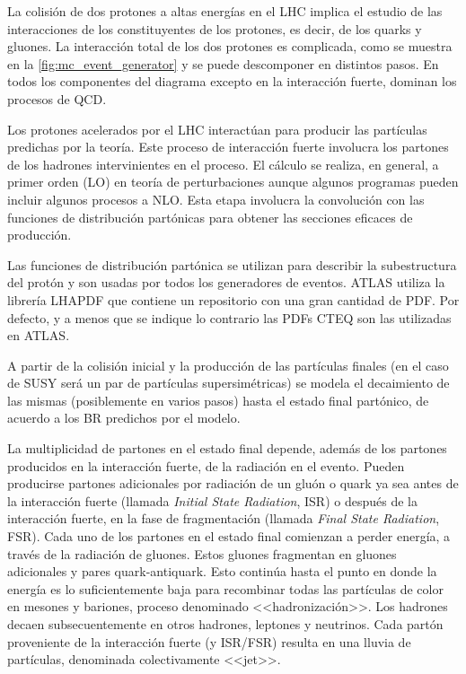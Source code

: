 La colisión de dos protones a altas energías en el LHC implica el estudio de las
interacciones de los constituyentes de los protones, es decir, de los quarks y
gluones. La interacción total de los dos protones es complicada, como se muestra
en la \cref{fig:mc_event_generator} y se puede descomponer en distintos pasos.
En todos los componentes del diagrama excepto en la interacción fuerte, dominan los procesos de QCD.

Los protones acelerados por el LHC interactúan para producir las partículas
predichas por la teoría. Este proceso de interacción fuerte involucra los
partones de los hadrones intervinientes en el proceso. El cálculo se realiza, en
general, a primer orden (LO) en teoría de perturbaciones aunque algunos
programas pueden incluir algunos procesos a NLO. Esta etapa involucra la
convolución con las funciones de distribución partónicas para obtener las
secciones eficaces de producción.

Las funciones de distribución partónica se utilizan para describir la
subestructura del protón y son usadas por todos los generadores de eventos.
ATLAS utiliza la librería LHAPDF \cite{Bourilkov:2006cj,Buckley:2014ana} que contiene un
repositorio con una gran
cantidad de PDF. Por defecto, y a menos que se indique lo contrario las PDFs
CTEQ \cite{Nadolsky:2008zw} son las utilizadas en ATLAS.

A partir de la colisión inicial y la producción de las partículas finales (en el
caso de SUSY será un par de partículas supersimétricas) se
modela el decaimiento de las mismas (posiblemente en varios pasos) hasta el
estado final partónico, de acuerdo a los BR predichos por el modelo.

La multiplicidad de partones en el estado final depende, además de los partones producidos en la interacción
fuerte, de la radiación en el evento. Pueden producirse partones adicionales por
radiación de un gluón o quark ya sea antes de la interacción fuerte (llamada
\emph{Initial State Radiation}, ISR) o después de la interacción fuerte, en la fase de
fragmentación (llamada \emph{Final State Radiation}, FSR).
Cada uno de los partones en el estado
final comienzan a perder energía, a través de la radiación de gluones. Estos
gluones fragmentan en gluones adicionales y pares quark-antiquark. Esto continúa
hasta el punto en donde la energía es lo suficientemente baja para recombinar
todas las partículas de color en mesones y bariones, proceso denominado
<<hadronización>>. Los hadrones decaen subsecuentemente en otros hadrones,
leptones y neutrinos. Cada partón proveniente de la interacción fuerte (y
ISR/FSR) resulta en una lluvia de partículas, denominada colectivamente
<<jet>>.


